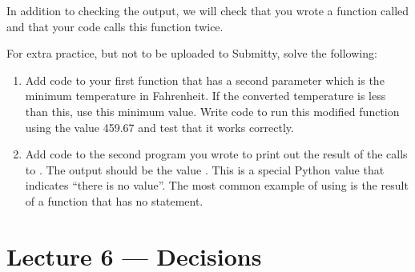 \documentclass[letterpaper,10pt,english]{sphinxmanual}
\begin{document}
\begin{enumerate}
\begin{sphinxVerbatim}[commandchars=\\\{\}]
  
\end{sphinxVerbatim}

In addition to checking the output, we will check that you wrote
a function called  and that your code calls this
function twice.

\end{enumerate}

For extra practice, but not to be uploaded to Submitty, solve the
following:
\begin{enumerate}
\item {} 
Add code to your first function that has a second parameter which
is the minimum temperature in Fahrenheit.  If the converted
temperature is less than this, use this minimum value.  Write code
to run this modified function using the value 459.67 and test that
it works correctly.

\item {} 
Add code to the second program you wrote to print out the
result of the calls to .  The output should be the value
.  This is a special Python value that indicates “there is
no value”.  The most common example of using  is the
result of a function that has no  statement.

\end{enumerate}


\chapter{Lecture 6 — Decisions}
\label{\detokenize{lecture_notes/lec06_conditionals1:lecture-6-decisions}}\label{\detokenize{lecture_notes/lec06_conditionals1::doc}}
\end{document}
